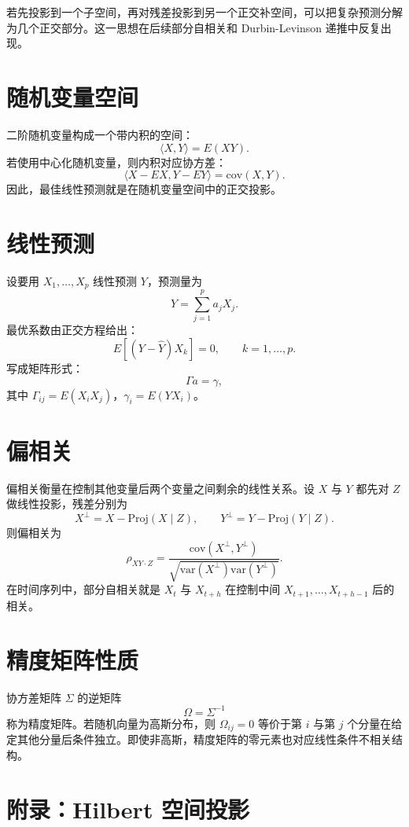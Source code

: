 \documentclass[11pt,a4paper]{ctexart}
\begin{document}
若先投影到一个子空间，再对残差投影到另一个正交补空间，可以把复杂预测分解为几个正交部分。这一思想在后续部分自相关和 Durbin-Levinson 递推中反复出现。

\section{随机变量空间}

二阶随机变量构成一个带内积的空间：
\[
  \langle X,Y\rangle=E(XY).
\]
若使用中心化随机变量，则内积对应协方差：
\[
  \langle X-E X,Y-EY\rangle=\mathrm{cov}(X,Y).
\]
因此，最佳线性预测就是在随机变量空间中的正交投影。

\section{线性预测}

设要用 \(X_1,\ldots,X_p\) 线性预测 \(Y\)，预测量为
\[
  \hat Y=\sum_{j=1}^p a_jX_j.
\]
最优系数由正交方程给出：
\[
  E\left[(Y-\hat Y)X_k\right]=0,\qquad k=1,\ldots,p.
\]
写成矩阵形式：
\[
  \Gamma a=\gamma,
\]
其中 \(\Gamma_{ij}=E(X_iX_j)\)，\(\gamma_i=E(YX_i)\)。

\section{偏相关}

偏相关衡量在控制其他变量后两个变量之间剩余的线性关系。设 \(X\) 与 \(Y\) 都先对 \(Z\) 做线性投影，残差分别为
\[
  X^\perp=X-\mathrm{Proj}(X\mid Z),\qquad
  Y^\perp=Y-\mathrm{Proj}(Y\mid Z).
\]
则偏相关为
\[
  \rho_{XY\cdot Z}
  =\frac{\mathrm{cov}(X^\perp,Y^\perp)}
  {\sqrt{\mathrm{var}(X^\perp)\mathrm{var}(Y^\perp)}}.
\]
在时间序列中，部分自相关就是 \(X_t\) 与 \(X_{t+h}\) 在控制中间 \(X_{t+1},\ldots,X_{t+h-1}\) 后的相关。

\section{精度矩阵性质}

协方差矩阵 \(\Sigma\) 的逆矩阵
\[
  \Omega=\Sigma^{-1}
\]
称为精度矩阵。若随机向量为高斯分布，则 \(\Omega_{ij}=0\) 等价于第 \(i\) 与第 \(j\) 个分量在给定其他分量后条件独立。即使非高斯，精度矩阵的零元素也对应线性条件不相关结构。

\section{附录：Hilbert 空间投影}
\end{document}
